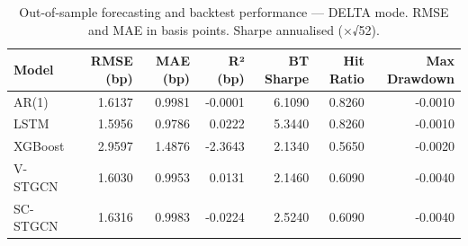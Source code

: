 \begin{table}
\caption{Out-of-sample forecasting and backtest performance — DELTA mode. RMSE and MAE in basis points. Sharpe annualised (×√52).}
\label{tab:results_delta}
\begin{tabular}{lrrrrrr}
\toprule
Model & RMSE (bp) & MAE (bp) & R² (bp) & BT Sharpe & Hit Ratio & Max Drawdown \\
\midrule
AR(1) & 1.6137 & 0.9981 & -0.0001 & 6.1090 & 0.8260 & -0.0010 \\
LSTM & 1.5956 & 0.9786 & 0.0222 & 5.3440 & 0.8260 & -0.0010 \\
XGBoost & 2.9597 & 1.4876 & -2.3643 & 2.1340 & 0.5650 & -0.0020 \\
V-STGCN & 1.6030 & 0.9953 & 0.0131 & 2.1460 & 0.6090 & -0.0040 \\
SC-STGCN & 1.6316 & 0.9983 & -0.0224 & 2.5240 & 0.6090 & -0.0040 \\
\bottomrule
\end{tabular}
\end{table}

